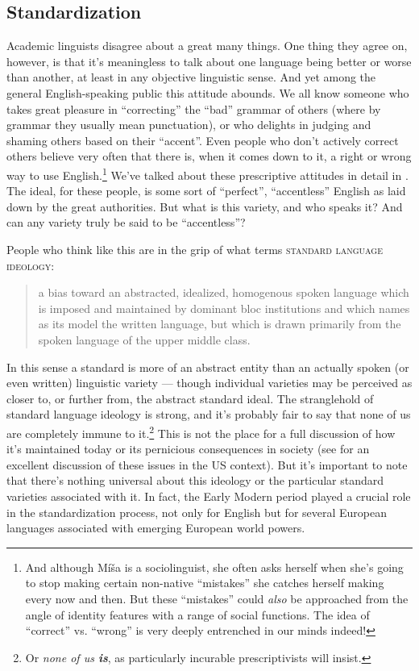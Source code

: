 \subsection{Standardization}\label{EModE-standardization}
Academic linguists disagree about a great many things. One thing they agree on, however, is that it's meaningless to talk about one language being better or worse than another, at least in any objective linguistic sense. And yet among the general English-speaking public this attitude abounds. We all know someone who takes great pleasure in ``correcting'' the ``bad'' grammar of others (where by grammar they usually mean punctuation), or who delights in judging and shaming others based on their ``accent''. Even people who don't actively correct others believe very often that there is, when it comes down to it, a right or wrong way to use English.\footnote{And although M\'{i}\v{s}a is a sociolinguist, she often asks herself when she's going to stop making certain non-native ``mistakes'' she catches herself making every now and then. But these ``mistakes'' could \textit{also} be approached from the angle of identity features with a range of social functions. The idea of ``correct'' vs. ``wrong'' is very deeply entrenched in our minds indeed!} We've talked about these prescriptive attitudes in detail in . The ideal, for these people, is some sort of ``perfect'', ``accentless'' English as laid down by the great authorities. But what is this variety, and who speaks it? And can any variety truly be said to be ``accentless''?

People who think like this are in the grip of what \citet[67]{Lippi2012} terms \textsc{standard language ideology}:

\begin{quote}
a bias toward an abstracted, idealized, homogenous spoken language which is imposed and maintained by dominant bloc institutions and which names as its model the written language, but which is drawn primarily from the spoken language of the upper middle class.
\end{quote}

\noindent In this sense a standard is more of an abstract entity than an actually spoken (or even written) linguistic variety — though individual varieties may be perceived as closer to, or further from, the abstract standard ideal. The stranglehold of standard language ideology is strong, and it's probably fair to say that none of us are completely immune to it.\footnote{Or \textit{none of us \textbf{is}}, as particularly incurable prescriptivists will insist.} This is not the place for a full discussion of how it's maintained today or its pernicious consequences in society (see \citealp{Lippi2012} for an excellent discussion of these issues in the US context). But it's important to note that there's nothing universal about this ideology or the particular standard varieties associated with it. In fact, the Early Modern period played a crucial role in the standardization process, not only for English but for several European languages associated with emerging European world powers.

